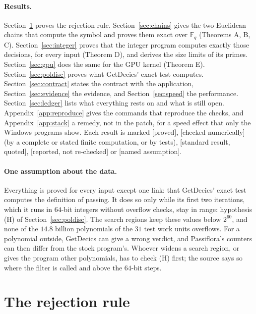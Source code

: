 \documentclass[10pt,a4paper]{article}
\newcommand{\Fq}{\mathbb{F}_q}
\newcommand{\stproved}{\textsf{\small[proved]}\xspace}
\newcommand{\stquoted}{\textsf{\small[standard result, quoted]}\xspace}
\newcommand{\stnum}{\textsf{\small[checked numerically]}\xspace}
\newcommand{\streport}{\textsf{\small[reported, not re-checked]}\xspace}
\newcommand{\stassume}{\textsf{\small[named assumption]}\xspace}
\theoremstyle{plain}
\theoremstyle{definition}
\begin{document}
\paragraph{Results.}  Section~\ref{sec:background} proves the rejection rule.  Section~\ref{sec:chains} gives the two Euclidean chains that compute the symbol
and proves them exact over $\Fq$ (Theorems A, B, C).  Section~\ref{sec:integer} proves that the integer program computes exactly those decisions, for every input
(Theorem D), and derives the size limits of its primes.  Section~\ref{sec:gpu} does the same for the GPU kernel (Theorem E).  Section~\ref{sec:poldisc} proves
what GetDecics' exact test computes.  Section~\ref{sec:contract} states the contract with the application, Section~\ref{sec:evidence} the evidence, and
Section~\ref{sec:speed} the performance.  Section~\ref{sec:ledger} lists what everything rests on and what is still open.  Appendix~\ref{app:reproduce} gives the
commands that reproduce the checks, and Appendix~\ref{app:stack} a remedy, not in the patch, for a speed effect that only the Windows programs show.  Each result
is marked \stproved, \stnum (by a complete or stated finite computation, or by tests), \stquoted, \streport or \stassume.

\paragraph{One assumption about the data.}  Everything is proved for every input except one link: that GetDecics' exact test computes the definition of
passing.  It does so only while its first two iterations, which it runs in $64$-bit integers without overflow checks, stay in range: hypothesis (H) of
Section~\ref{sec:poldisc}.  The search regions keep these values below $2^{60}$, and none of the $14.8$ billion polynomials of the $31$ test work units
overflows.  For a polynomial outside, GetDecics can give a wrong verdict, and Passiflora's counters can then differ from the stock program's.  Whoever widens a
search region, or gives the program other polynomials, has to check (H) first; the source says so where the filter is called and above the $64$-bit steps.

\section{The rejection rule}\label{sec:background}
\end{document}

